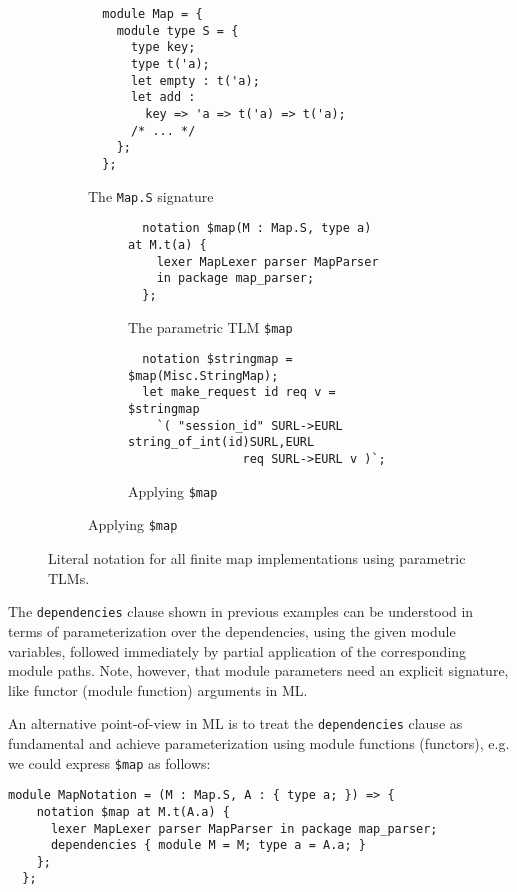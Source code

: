 \documentclass[acmsmall,screen]{acmart}
\newcommand{\li}[1]{\lstinline[basicstyle=\ttfamily\fontsize{9pt}{1em}\selectfont]{#1}}
\begin{document}
\begin{figure}
\begin{subfigure}[t]{0.4\textwidth}
\begin{lstlisting}
  module Map = { 
    module type S = {
      type key;
      type t('a);
      let empty : t('a);
      let add : 
        key => 'a => t('a) => t('a);
      /* ... */
    };
  };
\end{lstlisting}
\vspace{-7px}
\caption{The \li{Map.S} signature}
\label{fig:map-sig}
\end{subfigure}
\hfill
\begin{subfigure}[t]{0.55\textwidth}
\begin{subfigure}[t]{\textwidth}
\begin{lstlisting}
  notation $map(M : Map.S, type a) at M.t(a) {
    lexer MapLexer parser MapParser 
    in package map_parser;
  };
\end{lstlisting}
\vspace{-8px}
\caption{The parametric TLM \li{$map}}
\vspace{5px}
\label{fig:map-tlm}
\end{subfigure}
\begin{subfigure}[b]{\textwidth}
\begin{lstlisting}
  notation $stringmap = $map(Misc.StringMap);
  let make_request id req v = $stringmap
    `( "session_id" SURL->EURL string_of_int(id)SURL,EURL
                req SURL->EURL v )`;
\end{lstlisting}
\vspace{-4px}
\caption{Applying \li{$map}}
\label{fig:map-ap}
\end{subfigure}
\end{subfigure}
\vspace{4px}
\caption{Literal notation for all finite map implementations using parametric TLMs.}
\vspace{-5px}
\label{fig:map-fig}
\end{figure}

The \li{dependencies} clause shown in previous examples can be understood in terms of parameterization over the dependencies, using the given module variables, followed immediately by partial application of the corresponding module paths. Note, however, that module parameters need an explicit signature, like functor (module function) arguments in ML.

An alternative point-of-view in ML is to treat the \li{dependencies} clause as fundamental and achieve parameterization using module functions (functors), e.g. we could express \li{$map} as follows:
\begin{lstlisting}[numbers=none]
  module MapNotation = (M : Map.S, A : { type a; }) => {
    notation $map at M.t(A.a) { 
      lexer MapLexer parser MapParser in package map_parser;
      dependencies { module M = M; type a = A.a; } 
    };
  };
\end{lstlisting}
\end{document}
